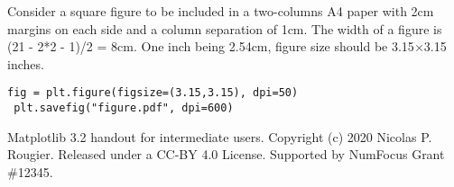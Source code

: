 \documentclass[10pt,landscape,a4paper]{article}
\begin{document}
\begin{multicols*}{3}
Consider a square figure to be included in a two-columns A4 paper with
2cm margins on each side and a column separation of 1cm. The width of
a figure is (21 - 2*2 - 1)/2 = 8cm. One inch being 2.54cm, figure size
should be 3.15$\times$3.15 inches.
\begin{lstlisting}[]
 fig = plt.figure(figsize=(3.15,3.15), dpi=50)
 plt.savefig("figure.pdf", dpi=600)
\end{lstlisting}






\vfill
%
{\scriptsize Matplotlib 3.2 handout for intermediate users. Copyright
  (c) 2020 Nicolas P. Rougier. Released under a CC-BY 4.0
  License. Supported by NumFocus Grant \#12345.\par}



\end{multicols*}
\end{document}
